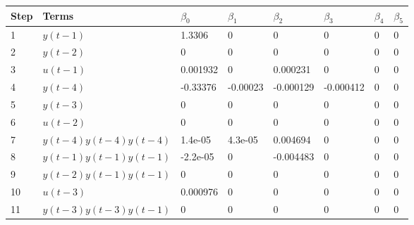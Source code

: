 \begin{tabular}{llllllll}
Step & Terms & $\beta_{0}$ & $\beta_{1}$ & $\beta_{2}$ & $\beta_{3}$ & $\beta_{4}$ & $\beta_{5}$ \\ 
\hline 
1 & $y(t-1)$ & 1.3306 & 0 & 0 & 0 & 0 & 0 \\ 
2 & $y(t-2)$ & 0 & 0 & 0 & 0 & 0 & 0 \\ 
3 & $u(t-1)$ & 0.001932 & 0 & 0.000231 & 0 & 0 & 0 \\ 
4 & $y(t-4)$ & -0.33376 & -0.00023 & -0.000129 & -0.000412 & 0 & 0 \\ 
5 & $y(t-3)$ & 0 & 0 & 0 & 0 & 0 & 0 \\ 
6 & $u(t-2)$ & 0 & 0 & 0 & 0 & 0 & 0 \\ 
7 & $y(t-4)y(t-4)y(t-4)$ & 1.4e-05 & 4.3e-05 & 0.004694 & 0 & 0 & 0 \\ 
8 & $y(t-1)y(t-1)y(t-1)$ & -2.2e-05 & 0 & -0.004483 & 0 & 0 & 0 \\ 
9 & $y(t-2)y(t-1)y(t-1)$ & 0 & 0 & 0 & 0 & 0 & 0 \\ 
10 & $u(t-3)$ & 0.000976 & 0 & 0 & 0 & 0 & 0 \\ 
11 & $y(t-3)y(t-3)y(t-1)$ & 0 & 0 & 0 & 0 & 0 & 0 \\ 
\hline 
\end{tabular}